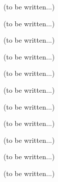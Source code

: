 




(to be written...)



(to be written...)



(to be written...)







(to be written...)



(to be written...)



(to be written...)



(to be written...)







(to be written...)



(to be written...)



(to be written...)







(to be written...)



